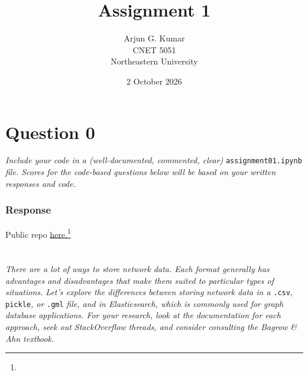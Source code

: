\documentclass{article}
\title{\textbf{Assignment 1}}
\author{Arjun G. Kumar\\
CNET 5051\\
Northeastern University}
\date{2 October 2026}
\newcommand{\response}{\subsubsection*{Response}}
\begin{document}
\maketitle
\section*{Question 0}
\textit{Include your code in a (well-documented, commented, clear) }\texttt{assignment01.ipynb}\textit{ file. Scores for the code-based questions below will be based on your written responses and code.}
\response
Public repo \href{https://github.com/14arjunk/CNET5051_Assignments/tree/main/Assignment%201%20Files}{here.}\footnote{\repourl}
\section{}
\textit{There are a lot of ways to store network data. Each format generally has advantages and disadvantages that make them suited to particular types of situations. Let’s explore the differences between storing network data in a }\texttt{.csv}, \texttt{pickle}\textit{, or} \texttt{.gml}\textit{ file, and in Elasticsearch, which is commonly used for graph database applications. For your research, look at the documentation for each approach, seek out StackOverflow threads, and consider consulting the Bagrow \& Ahn textbook.}
\end{document}
